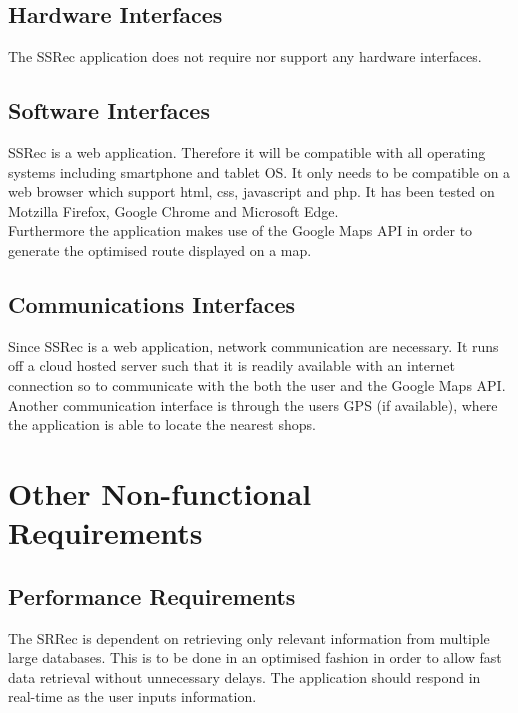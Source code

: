 \documentclass[10pt, a4paper, onecolumn]{scrartcl}
\begin{document}
		\subsection{Hardware Interfaces}
		
			The SSRec application does not require nor support any hardware interfaces.
		
		\subsection{Software Interfaces}
		
			SSRec is a web application. Therefore it will be compatible with all operating systems including smartphone and tablet OS. It only needs to be compatible on a web browser which support html, css, javascript and php. It has been tested on Motzilla Firefox, Google Chrome and Microsoft Edge.\\
			
			Furthermore the application makes use of the Google Maps API in order to generate the optimised route displayed on a map.
		
		\subsection{Communications Interfaces}
		
			Since SSRec is a web application, network communication are necessary. It runs off a cloud hosted server such that it is readily available with an internet connection so to communicate with the both the user and the Google Maps API. Another communication interface is through the users GPS (if available), where the application is able to locate the nearest shops.
	
	\section{Other Non-functional Requirements}
	
		\subsection{Performance Requirements}
		
			The SRRec is dependent on retrieving only relevant information from multiple large databases. This is to be done in an optimised fashion in order to allow fast data retrieval without unnecessary delays. The application should respond in real-time as the user inputs information.\\
		
\end{document}
